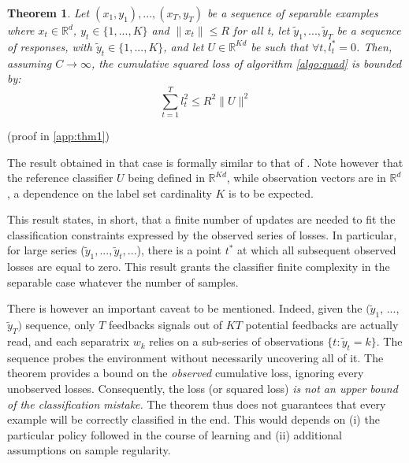 \documentclass[preprint,12pt,authoryear]{elsarticle}
\newtheorem{theorem}{Theorem}
\begin{document}

\begin{theorem}
	\label{theo:BPAT1}
	Let $(x_1,y_1),...,(x_T,y_T)$ be a sequence of separable examples where $x_t \in \mathbb{R}^d$, $y_t\in \{1,...,K\}$ and $\parallel x_t\parallel\leqslant R$ for all t, let $\tilde{y}_1,...,\tilde{y}_T$ be a sequence of responses, with $\tilde{y}_t\in \{1,...,K\}$, 
	and let $U \in \mathbb{R}^{K d}$ be such that $ \forall t, l^*_t=0$. Then, assuming $C \rightarrow \infty$, the cumulative squared loss of algorithm \ref{algo:quad} is bounded by:
	\begin{equation}
	\sum_{t=1}^{T} l_t^2 \leqslant R^2 \parallel{U}\parallel^2
	\end{equation}
\end{theorem}
(proof in \ref{app:thm1})

The result obtained in that case is formally similar to that of  \cite{crammer2006online}. Note however that the reference classifier $U$ being defined in $\mathbb{R}^{Kd}$, while observation vectors are in $\mathbb{R}^{d}$, a dependence on the label set cardinality $K$ is to be expected. 

This result states, in short, that a finite number of updates are needed to fit the classification constraints expressed by the observed series of losses. In particular, for large series ($\tilde{y}_1, ...,\tilde{y}_t, ...$), there is a point $t^*$ at which all subsequent observed losses are equal to zero. This result grants the classifier finite complexity in the separable case whatever the number of samples. 

There is however an important caveat to be mentioned. 
Indeed, given the  $ (\tilde{y}_1$, ..., $\tilde{y}_T)$ sequence, only $T$ feedbacks signals out of $KT$ potential feedbacks are actually read,
and each separatrix $w_k$ relies on a sub-series of observations $\{t: \tilde{y}_t = k\}$.
The sequence probes the environment without necessarily uncovering all of it. The theorem provides a bound on the \emph{observed} cumulative loss, ignoring every unobserved losses. 
Consequently, the loss (or squared loss) \emph{is not an upper bound of the classification mistake.} The theorem thus does not guarantees that every example will be correctly classified in the end. This would depends on (i) the particular policy followed in the course of learning and (ii)  additional assumptions on sample regularity.   
\end{document}
